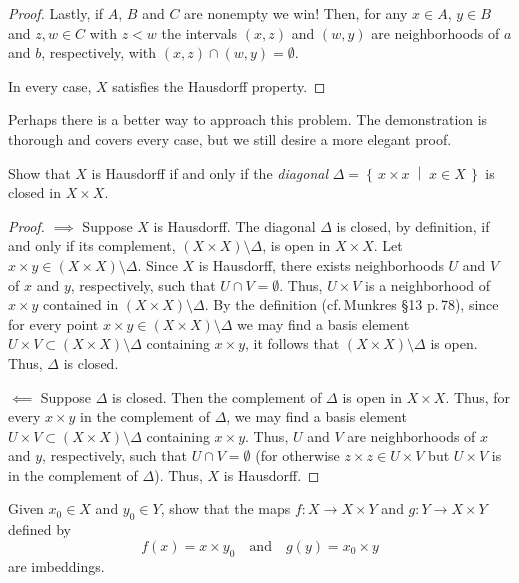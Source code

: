 \begin{proof}
Lastly, if $A$, $B$ and $C$ are nonempty we win! Then, for any
$x\in A$, $y\in B$ and $z,w\in C$ with $z<w$ the intervals
$(x,z)$ and $(w,y)$ are neighborhoods of $a$ and $b$,
respectively, with $(x,z)\cap (w,y)=\emptyset$.

In every case, $X$ satisfies the Hausdorff property.
\end{proof}
\begin{remarks*}
Perhaps there is a better way to approach this problem. The
demonstration is thorough and covers every case, but we still
desire a more elegant proof.
\end{remarks*}
\newpage
\begin{problem}[Munkres \S17, p.\,101, 13]
Show that $X$ is Hausdorff if and only if the \emph{diagonal}
$\Delta=\left\{\,x\times x\;\middle|\;x\in X\,\right\}$ is closed
in $X\times X$.
\end{problem}
\begin{proof}
$\implies$ Suppose $X$ is Hausdorff. The diagonal $\Delta$ is
closed, by definition, if and only if its complement, $(X\times
X)\setminus\Delta$, is open in $X\times X$. Let $x\times
y\in(X\times X)\setminus\Delta$. Since $X$ is Hausdorff, there
exists neighborhoods $U$ and $V$ of $x$ and $y$, respectively,
such that $U\cap V=\emptyset$. Thus, $U\times V$ is a
neighborhood of $x\times y$ contained in $(X\times X)\setminus
\Delta$. By the definition (cf.\,Munkres \S13 p.\,78), since for
every point $x\times y\in(X\times X)\setminus\Delta$ we may find
a basis element $U\times V\subset (X\times X)\setminus\Delta$
containing $x\times y$, it follows that $(X\times
X)\setminus\Delta$ is open. Thus, $\Delta$ is closed.

$\impliedby$ Suppose $\Delta$ is closed. Then the complement
of $\Delta$ is open in $X\times X$. Thus, for every $x\times y$
in the complement of $\Delta$, we may find a basis element
$U\times V\subset(X\times X)\setminus\Delta$ containing $x\times
y$. Thus, $U$ and $V$ are neighborhoods of $x$ and $y$,
respectively, such that $U\cap V=\emptyset$ (for otherwise
$z\times z\in U\times V$ but $U\times V$ is in the complement of
$\Delta$). Thus, $X$ is Hausdorff.
\end{proof}
\newpage
\begin{problem}[Munkres \S18, p.\,111, 4]
Given $x_0\in X$ and $y_0\in Y$, show that the maps $f\colon X\to
X\times Y$ and $g\colon Y\to X\times Y$ defined by
\[
f(x)=x\times y_0\quad\text{and}\quad g(y)=x_0\times y
\]
are imbeddings.
\end{problem}
